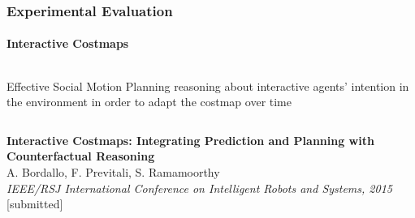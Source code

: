 \begin{frame}
	\frametitle{Experimental Evaluation}
	\framesubtitle{Interactive Costmaps}
	
	\large
	
	\begin{columns}[t]
		{
			
			\begin{block}{Effective Social Motion Planning}
				reasoning about interactive agents' intention in the environment in order to adapt the
				costmap over time
			\end{block}
			
		}
	\end{columns}
	
	\vspace{0.2cm}
	
	\begin{center}
	\end{center}
	
	\vspace{0.36cm}
	
	\tiny
	
	\textbf{Interactive Costmaps: Integrating Prediction and Planning with Counterfactual Reasoning}\\
	A. Bordallo, F. Previtali, S. Ramamoorthy \\
	\emph{IEEE/RSJ International Conference on Intelligent Robots and Systems, 2015} [submitted] \\
\end{frame}

